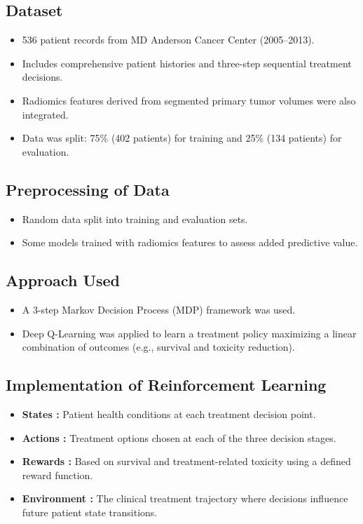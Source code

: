 \subsection*{Dataset}
\begin{itemize}
    \item 536 patient records from MD Anderson Cancer Center (2005–2013).
    \item Includes comprehensive patient histories and three-step sequential treatment decisions.
    \item Radiomics features derived from segmented primary tumor volumes were also integrated.
    \item Data was split: 75\% (402 patients) for training and 25\% (134 patients) for evaluation.
\end{itemize}

\subsection*{Preprocessing of Data}
\begin{itemize}
    \item Random data split into training and evaluation sets.
    \item Some models trained with radiomics features to assess added predictive value.
\end{itemize}

\subsection*{Approach Used}
\begin{itemize}
    \item A 3-step Markov Decision Process (MDP) framework was used.
    \item Deep Q-Learning was applied to learn a treatment policy maximizing a linear combination of outcomes (e.g., survival and toxicity reduction).
\end{itemize}

\subsection*{Implementation of Reinforcement Learning}
\begin{itemize}
    \item \textbf{States :} Patient health conditions at each treatment decision point.
    \item \textbf{Actions :} Treatment options chosen at each of the three decision stages.
    \item \textbf{Rewards :} Based on survival and treatment-related toxicity using a defined reward function.
    \item \textbf{Environment :} The clinical treatment trajectory where decisions influence future patient state transitions.
\end{itemize}

